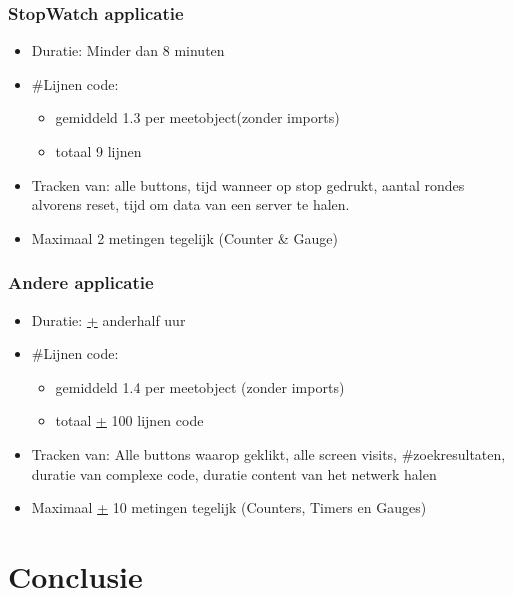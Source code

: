 \subsubsection{StopWatch applicatie}
\begin{itemize}
\item ​​Duratie: Minder dan 8 minuten
\item \#Lijnen code:\begin{itemize}
\item ​gemiddeld 1.3 per meetobject(zonder imports)
\item totaal 9 lijnen
\end{itemize}

\item ​​​Tracken van: alle buttons, tijd wanneer op stop gedrukt, aantal rondes alvorens reset, tijd om data van een server te halen.

\item Maximaal 2 metingen tegelijk (Counter \& Gauge)
\end{itemize}

\subsubsection{Andere applicatie}
\begin{itemize}
\item ​Duratie: \underline{+} anderhalf uur
\item \#​Lijnen code: \begin{itemize}
\item ​​gemiddeld 1.4 per meetobject (zonder imports)
\item totaal \underline{+} 100 lijnen code
\end{itemize}

\item ​Tracken van: Alle buttons waarop geklikt, alle screen visits, \#zoekresultaten, duratie van complexe code, duratie content van het netwerk halen
\item Maximaal \underline{+} 10 metingen tegelijk (Counters, Timers en Gauges)
\end{itemize}

\section{Conclusie}\label{Section:Conclusie}



